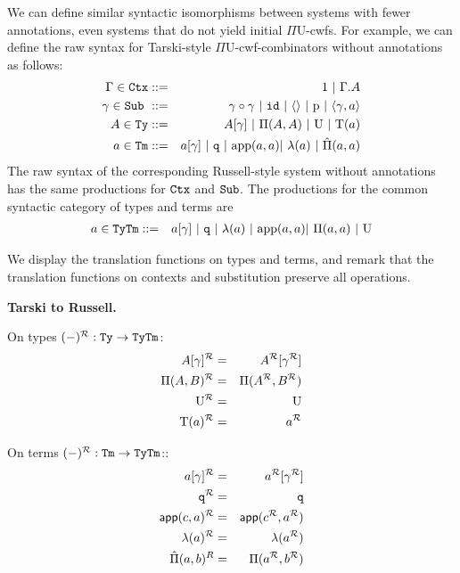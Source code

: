 \documentclass{lmcs}
\def\UU{\mathrm{U}}
\def\Ta{\mathrm{T}}
\def\Pihat{\hat{\Pi}}
\begin{document}
We can define similar syntactic isomorphisms between systems with fewer annotations, even systems that do not yield initial $\Pi\UU$-cwfs. For example, we can define the raw syntax for Tarski-style $\Pi\UU$-cwf-combinators without annotations as follows:
\begin{eqnarray*}
\Gamma \in \RawCtx &::=& 1  \ |\ \Gamma.A\\
\gamma \in \RawSub \ &::=& \gamma \circ \gamma \ |\ \id \ |\ \langle\rangle \ |\ \p \ |\ \langle \gamma, a \rangle\\
A \in \RawTy &::=& A[\gamma]   \ |\  \Pi(A,A)\ |\  \UU  \ |\  \Ta(a)\\
a \in \RawTm &::=& a[\gamma] \ |\ \qI\ |\  \ap(a,a) |\ \lambda(a)\ |\ \hat{\Pi}(a,a)
\end{eqnarray*}
The raw syntax of the corresponding Russell-style system without annotations has the same productions for ${\tt Ctx}$ and ${\tt Sub}$. The productions for the common syntactic category of types and terms are
\begin{eqnarray*}
a \in \RawTy\RawTm &::=& a [\gamma] \ |\ \qI\  |\   \lambda(a) \ |\ 
\ap(a,a) |\  \Pi(a,a)  \ |\  \UU
\end{eqnarray*}

We display the translation functions on types and terms, and remark that the translation functions on contexts and substitution preserve all operations.

{\bf Tarski to Russell.} 

On types $(-)^{\mathcal{R}} : {\tt Ty} \to {\tt Ty}{\tt Tm}$:
\begin{eqnarray*}
A[\gamma]^\R&=& A^\R[\gamma^\R]\\
\Pi(A,B)^\R&=& \Pi(A^\R,B^\R)\\
\UU^\R&=& \UU\\
\Ta(a)^\R &=& a^\R
\end{eqnarray*}

On terms $(-)^{\mathcal{R}} : {\tt Tm} \to {\tt Ty}{\tt Tm}$::
\begin{eqnarray*}
a[\gamma]^\R&=& a^\R[\gamma^\R]\\
\qI^\R &=& \qI\\
\app(c,a)^\R &=& \app(c^\R,a^\R)\\
\lambda(a)^\R &=& \lambda(a^\R)\\
\Pihat(a,b)^R &=& \Pi(a^\R,b^\R)
\end{eqnarray*}
\end{document}
